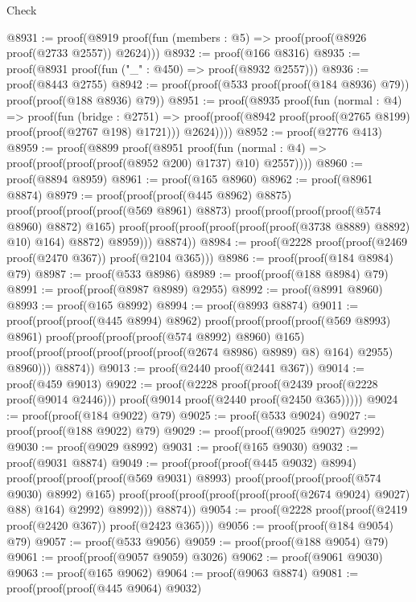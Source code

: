 \begin{lexlean}{Check}
\begin{coremodule}
@8931 := proof(@8919 proof(fun (members : @5) => proof(proof(@8926 proof(@2733 @2557)) @2624)))
@8932 := proof(@166 @8316)
@8935 := proof(@8931 proof(fun ("_" : @450) => proof(@8932 @2557)))
@8936 := proof(@8443 @2755)
@8942 := proof(proof(@533 proof(proof(@184 @8936) @79)) proof(proof(@188 @8936) @79))
@8951 := proof(@8935
      proof(fun (normal : @4) =>
        proof(fun (bridge : @2751) =>
          proof(proof(@8942 proof(proof(@2765 @8199) proof(proof(@2767 @198) @1721))) @2624))))
@8952 := proof(@2776 @413)
@8959 := proof(@8899
      proof(@8951
          proof(fun (normal : @4) => proof(proof(proof(proof(@8952 @200) @1737) @10) @2557))))
@8960 := proof(@8894 @8959)
@8961 := proof(@165 @8960)
@8962 := proof(@8961 @8874)
@8979 := proof(proof(proof(@445 @8962) @8875)
      proof(proof(proof(proof(@569 @8961) @8873)
            proof(proof(proof(proof(@574 @8960) @8872) @165)
                proof(proof(proof(proof(proof(proof(@3738 @8889) @8892) @10) @164) @8872) @8959)))
          @8874))
@8984 := proof(@2228 proof(proof(@2469 proof(@2470 @367)) proof(@2104 @365)))
@8986 := proof(proof(@184 @8984) @79)
@8987 := proof(@533 @8986)
@8989 := proof(proof(@188 @8984) @79)
@8991 := proof(proof(@8987 @8989) @2955)
@8992 := proof(@8991 @8960)
@8993 := proof(@165 @8992)
@8994 := proof(@8993 @8874)
@9011 := proof(proof(proof(@445 @8994) @8962)
      proof(proof(proof(proof(@569 @8993) @8961)
            proof(proof(proof(proof(@574 @8992) @8960) @165)
                proof(proof(proof(proof(proof(proof(@2674 @8986) @8989) @8) @164) @2955) @8960)))
          @8874))
@9013 := proof(@2440 proof(@2441 @367))
@9014 := proof(@459 @9013)
@9022 := proof(@2228
      proof(proof(@2439 proof(@2228 proof(@9014 @2446)))
          proof(@9014 proof(@2440 proof(@2450 @365)))))
@9024 := proof(proof(@184 @9022) @79)
@9025 := proof(@533 @9024)
@9027 := proof(proof(@188 @9022) @79)
@9029 := proof(proof(@9025 @9027) @2992)
@9030 := proof(@9029 @8992)
@9031 := proof(@165 @9030)
@9032 := proof(@9031 @8874)
@9049 := proof(proof(proof(@445 @9032) @8994)
      proof(proof(proof(proof(@569 @9031) @8993)
            proof(proof(proof(proof(@574 @9030) @8992) @165)
                proof(proof(proof(proof(proof(proof(@2674 @9024) @9027) @88) @164) @2992) @8992)))
          @8874))
@9054 := proof(@2228 proof(proof(@2419 proof(@2420 @367)) proof(@2423 @365)))
@9056 := proof(proof(@184 @9054) @79)
@9057 := proof(@533 @9056)
@9059 := proof(proof(@188 @9054) @79)
@9061 := proof(proof(@9057 @9059) @3026)
@9062 := proof(@9061 @9030)
@9063 := proof(@165 @9062)
@9064 := proof(@9063 @8874)
@9081 := proof(proof(proof(@445 @9064) @9032)

\end{coremodule}
\end{lexlean}
